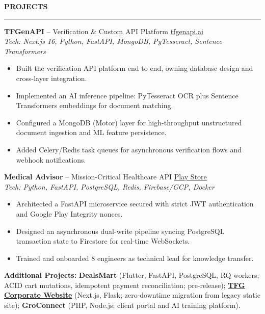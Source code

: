 \documentclass{resume}
\renewenvironment{rSection}[1]{
    \vspace{8pt}
    \noindent
    {\bfseries\MakeUppercase{#1}}
    \par
    \vspace{-3.5pt}
    \noindent\rule{\textwidth}{0.4pt}
    \par
    \vspace{4pt}
}{
    \vspace{3pt}
}
\begin{document}
\begin{rSection}{PROJECTS}
\vspace{3pt}



\textbf{TFGenAPI} -- Verification \& Custom API Platform
\hfill \href{https://tfgenapi.ai/}{tfgenapi.ai} \\[-1pt]
\textit{Tech: Next.js 16, Python, FastAPI, MongoDB, PyTesseract, Sentence Transformers}

\vspace{-2pt}

\begin{itemize}
    \item Built the verification API platform end to end, owning database design and cross-layer integration. %
    \item Implemented an AI inference pipeline: PyTesseract OCR plus Sentence Transformers embeddings for document matching.
    \item Configured a MongoDB (Motor) layer for high-throughput unstructured document ingestion and ML feature persistence.
    \item Added Celery/Redis task queues for asynchronous verification flows and webhook notifications.
\end{itemize}

\vspace{3pt}



\textbf{Medical Advisor} -- Mission-Critical Healthcare API
\hfill \href{https://play.google.com/store/apps/details?id=com.tfg.medicaladvisor&pcampaignid=web_share}{Play Store} \\[-1pt]
\textit{Tech: Python, FastAPI, PostgreSQL, Redis, Firebase/GCP, Docker}

\vspace{-2pt}

\begin{itemize}
    \item Architected a FastAPI microservice secured with strict JWT authentication and Google Play Integrity nonces.
    \item Designed an asynchronous dual-write pipeline syncing PostgreSQL transaction state to Firestore for real-time WebSockets.
    \item Trained and onboarded 8 engineers as technical lead for knowledge transfer.
\end{itemize}

\vspace{3pt}

\textbf{Additional Projects:}
\textbf{DealsMart} (Flutter, FastAPI, PostgreSQL, RQ workers; ACID cart mutations, idempotent payment reconciliation; pre-release);
\href{https://tfgroup.ai/en}{\textbf{TFG Corporate Website}} (Next.js, Flask; zero-downtime migration from legacy static site);
\textbf{GroConnect} (PHP, Node.js; client portal and AI training platform).

\end{rSection}
\end{document}
